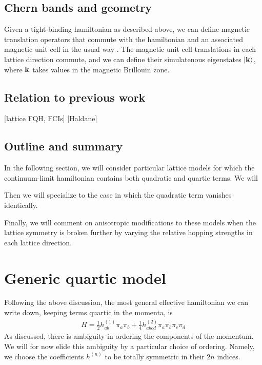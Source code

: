 \documentclass[aps,prb,twocolumn,letterpaper,twoside,nobalancelastpage,groupedaddress,amsmath,amssymb,floatfix,citeautoscript]{revtex4-1}
\begin{document}



\subsection{Chern bands and geometry}
Given a tight-binding hamiltonian as described above, we can define magnetic translation operators that commute with the hamiltonian and an associated magnetic unit cell in the usual way \cite{FradkinBook}. The magnetic unit cell translations in each lattice direction commute, and we can define their simulatenous eigenstates $\ket{{\bf k}}$, where ${\bf k}$ takes values in the magnetic Brillouin zone.




\subsection{Relation to previous work}
[lattice FQH, FCIs]
[Haldane]

\subsection{Outline and summary}
In the following section, we will consider particular lattice models for which the continuum-limit hamiltonian contains both quadratic and quartic terms. We will 

Then we will specialize to the case in which the quadratic term vanishes identically. 

Finally, we will comment on anisotropic modifications to these models when the lattice symmetry is broken further by varying the relative hopping strengths in each lattice direction.

\section{Generic quartic model}
Following the above discussion, the most general effective hamiltonian we can write down, keeping terms quartic in the momenta, is 
\begin{align*}
H = \frac{1}{2}h^{(1)}_{ab} \pi_a \pi_b + \frac{1}{4}h^{(2)}_{abcd} \pi_a \pi_b \pi_c \pi_d
\end{align*}
As discussed, there is ambiguity in ordering the components of the momentum. We will for now elide this ambiguity by a particular choice of ordering. Namely, we choose the coefficients $h^{(n)}$ to be totally symmetric in their $2n$ indices.
\end{document}
